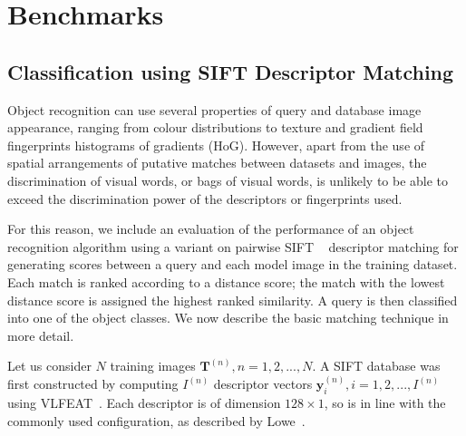 \section{Benchmarks} \label{sec:benchmarks}




\subsection{Classification using SIFT Descriptor Matching}

Object recognition can use several properties of query and database image appearance, ranging from colour distributions to texture and gradient field fingerprints \eg histograms of gradients (HoG). However, apart from the use of spatial arrangements of putative matches between datasets and images, the discrimination of visual words, or bags of visual words, is unlikely to be able to exceed the discrimination power of the descriptors or fingerprints used.

For this reason, we include an evaluation of the performance of an object recognition algorithm using a variant on pairwise SIFT ~\cite{Lowe2004} descriptor matching for generating scores between a query and each model image in the training dataset. Each match is ranked according to a distance score; the match with the lowest distance score is assigned the highest ranked similarity. A query is then classified into one of the object classes. We now describe the basic matching technique in more detail.

Let us consider $N$ training images $\mathbf{T}^{(n)}, n = 1, 2, ..., N$. A SIFT database was first constructed by computing $I^{(n)}$ descriptor vectors $\mathbf{y}_i^{(n)}, i = 1, 2, ..., I^{(n)}$ using VLFEAT~\cite{Vedaldi2008}. Each descriptor is of dimension $128\times 1$, so is in line with the commonly used configuration, as described by Lowe~\cite{Lowe2004}.

